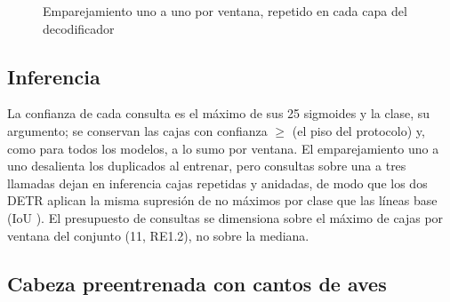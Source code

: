 \documentclass[12pt,a4paper]{article}
\begin{document}
\begin{figure}[htbp]
    \centering
    \caption{Emparejamiento uno a uno por ventana, repetido en cada capa del decodificador}
    \label{fig:matching}
\end{figure}

\subsection{Inferencia}
\label{sec:inferencia}

La confianza de cada consulta es el máximo de sus 25 sigmoides y la clase, su argumento; se
conservan las cajas con confianza $\geq$ \scoreFloor{} (el piso del protocolo) y, como para
todos los modelos, a lo sumo \maxDetections{} por ventana. El emparejamiento uno a uno
desalienta los duplicados al entrenar, pero \nQueries{} consultas sobre una a tres llamadas
dejan en inferencia cajas repetidas y anidadas, de modo que los dos DETR aplican la misma
supresión de no máximos por clase que las líneas base (IoU \nmsIou{}). El presupuesto de
\nQueries{} consultas se dimensiona sobre el máximo de cajas por ventana del conjunto (11,
RE1.2), no sobre la mediana.

\subsection{Cabeza preentrenada con cantos de aves}
\label{sec:aves}
\end{document}
